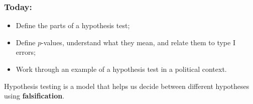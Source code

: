 \documentclass[aspectratio=169]{beamer}
\theoremstyle{principle}
\begin{document}
\begin{frame}
\frametitle{Today:}

\begin{itemize}
\item Define the parts of a hypothesis test;
\bigskip
\bigskip
\bigskip

\item Define $p$-values, understand what they mean, and relate them to type I errors;
\bigskip
\bigskip
\bigskip

\item Work through an example of a hypothesis test in a political context.

\end{itemize}

\end{frame}

\begin{frame}

\begin{center}
\Huge Hypothesis testing is a model that helps us decide between different hypotheses using \textbf{falsification}.\\
\end{center}

\end{frame}
\end{document}
